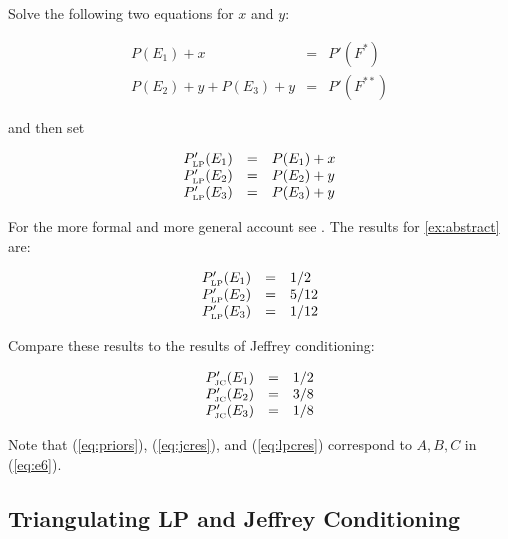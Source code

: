 \documentclass[phd,12pt,oneside]{ubcthesis}
\begin{document}
Solve the following two equations for $x$ and $y$:

\begin{equation}
  \label{eq:lpce}
  \begin{array}{rcl}
    P(E_{1})+x&=&P'(F^{*}) \\
    P(E_{2})+y+P(E_{3})+y&=&P'(F^{**})
  \end{array}
\end{equation}

{\noindent}and then set

\begin{equation}
  \label{eq:lpcf}
  \begin{array}{rcl}
    P'_{\mbox{\tiny LP}}(E_{1})&=&P(E_{1})+x \\
    P'_{\mbox{\tiny LP}}(E_{2})&=&P(E_{2})+y \\
    P'_{\mbox{\tiny LP}}(E_{3})&=&P(E_{3})+y
  \end{array}
\end{equation}

For the more formal and more general account see
. The results for {\xample}
\ref{ex:abstract} are:

\begin{equation}
  \label{eq:lpcres}
  \begin{array}{rcl}
    P'_{\mbox{\tiny LP}}(E_{1})&=&1/2 \\
    P'_{\mbox{\tiny LP}}(E_{2})&=&5/12 \\
    P'_{\mbox{\tiny LP}}(E_{3})&=&1/12
  \end{array}
\end{equation}

{\noindent}Compare these results to the results of Jeffrey conditioning:

\begin{equation}
  \label{eq:jcres}
  \begin{array}{rcl}
    P'_{\mbox{\tiny JC}}(E_{1})&=&1/2 \\
    P'_{\mbox{\tiny JC}}(E_{2})&=&3/8 \\
    P'_{\mbox{\tiny JC}}(E_{3})&=&1/8
  \end{array}
\end{equation}

{\noindent}Note that (\ref{eq:priors}), (\ref{eq:jcres}), and (\ref{eq:lpcres})
correspond to $A,B,C$ in (\ref{eq:e6}). 

\subsection{Triangulating LP and Jeffrey Conditioning}
\label{subsec:ieseiwoh}
\end{document}
